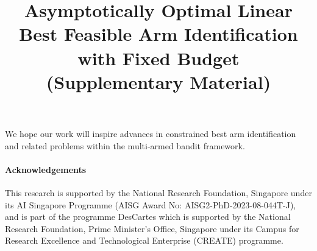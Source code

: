 \documentclass[accepted]{uai2025} %
\theoremstyle{plain}
\theoremstyle{definition}
\theoremstyle{remark}
\begin{document}
We hope our work will inspire advances in constrained best arm identification and related problems within the multi-armed bandit framework.


\paragraph{Acknowledgements} 
This research is supported by the National Research Foundation, Singapore under its
AI Singapore Programme (AISG Award No: AISG2-PhD-2023-08-044T-J), and is part of the programme
DesCartes which is supported by the National Research Foundation, Prime Minister’s Office, Singapore
under its Campus for Research Excellence and Technological Enterprise (CREATE) programme.












\newpage

\onecolumn

\title{Asymptotically Optimal Linear Best Feasible Arm Identification with Fixed Budget\\(Supplementary Material)}
\maketitle


\appendix
\end{document}
